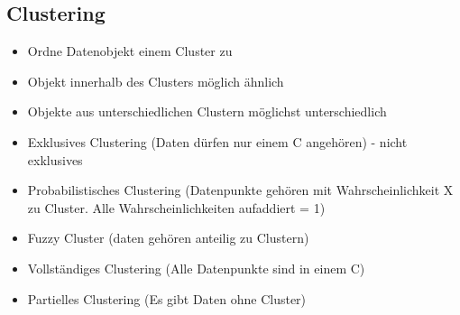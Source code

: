 \documentclass[a4paper]{article}
\begin{document}
\begin{landscape}
\begin{multicols}{3}
    \section{Clustering}
    \begin{itemize}[noitemsep,nolistsep]
        \item Ordne Datenobjekt einem Cluster zu 
        \item Objekt innerhalb des Clusters möglich ähnlich 
        \item Objekte aus unterschiedlichen Clustern möglichst unterschiedlich
        \item Exklusives Clustering (Daten dürfen nur einem C angehören) - nicht exklusives 
        \item Probabilistisches Clustering (Datenpunkte gehören mit Wahrscheinlichkeit X zu Cluster. Alle Wahrscheinlichkeiten aufaddiert = 1)
        \item Fuzzy Cluster (daten gehören anteilig zu Clustern)
        \item Vollständiges Clustering (Alle Datenpunkte sind in einem C)
        \item Partielles Clustering (Es gibt Daten ohne Cluster)
    \end{itemize}


\end{multicols}
\end{landscape}
\end{document}

